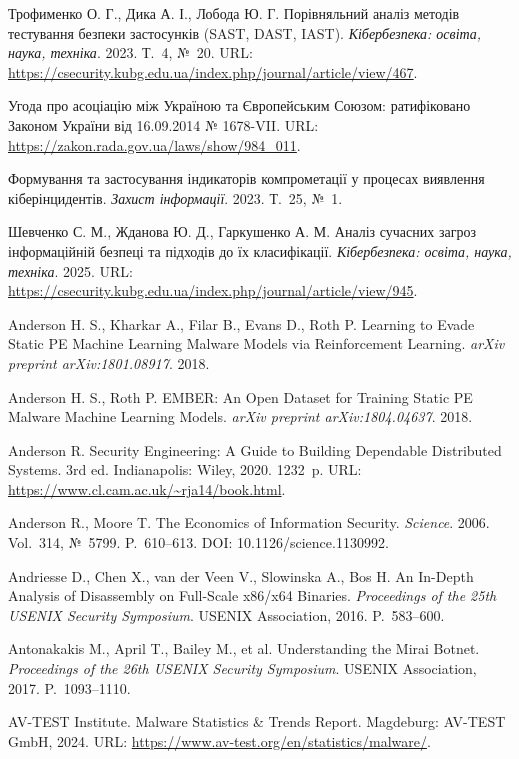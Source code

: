  Трофименко О. Г., Дика А. І., Лобода Ю. Г. Порівняльний аналіз методів тестування безпеки застосунків (SAST, DAST, IAST). \emph{Кібербезпека: освіта, наука, техніка}. 2023. Т.~4, №~20. URL: \url{https://csecurity.kubg.edu.ua/index.php/journal/article/view/467}.

 Угода про асоціацію між Україною та Європейським Союзом: ратифіковано Законом України від 16.09.2014 № 1678-VII. URL: \url{https://zakon.rada.gov.ua/laws/show/984_011}.

 Формування та застосування індикаторів компрометації у процесах виявлення кіберінцидентів. \emph{Захист інформації}. 2023. Т.~25, №~1.

 Шевченко С. М., Жданова Ю. Д., Гаркушенко А. М. Аналіз сучасних загроз інформаційній безпеці та підходів до їх класифікації. \emph{Кібербезпека: освіта, наука, техніка}. 2025. URL: \url{https://csecurity.kubg.edu.ua/index.php/journal/article/view/945}.

 Anderson H. S., Kharkar A., Filar B., Evans D., Roth P. Learning to Evade Static PE Machine Learning Malware Models via Reinforcement Learning. \emph{arXiv preprint arXiv:1801.08917}. 2018.

 Anderson H. S., Roth P. EMBER: An Open Dataset for Training Static PE Malware Machine Learning Models. \emph{arXiv preprint arXiv:1804.04637}. 2018.

 Anderson R. Security Engineering: A Guide to Building Dependable Distributed Systems. 3rd ed. Indianapolis: Wiley, 2020. 1232~p. URL: \url{https://www.cl.cam.ac.uk/~rja14/book.html}.

 Anderson R., Moore T. The Economics of Information Security. \emph{Science}. 2006. Vol.~314, №~5799. P.~610--613. DOI: 10.1126/science.1130992.

 Andriesse D., Chen X., van der Veen V., Slowinska A., Bos H. An In-Depth Analysis of Disassembly on Full-Scale x86/x64 Binaries. \emph{Proceedings of the 25th USENIX Security Symposium}. USENIX Association, 2016. P.~583--600.

 Antonakakis M., April T., Bailey M., et al. Understanding the Mirai Botnet. \emph{Proceedings of the 26th USENIX Security Symposium}. USENIX Association, 2017. P.~1093--1110.

 AV-TEST Institute. Malware Statistics \& Trends Report. Magdeburg: AV-TEST GmbH, 2024. URL: \url{https://www.av-test.org/en/statistics/malware/}.

